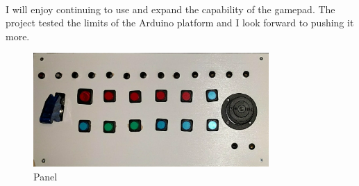 \documentclass[12pt,a4paper]{article}
\begin{document}
\paragraph{}
I will enjoy continuing to use and expand the capability of the gamepad. The project tested the limits of the Arduino platform and I look forward to pushing it more.

\begin{figure}[!h]
	\centering
	\includegraphics[width=0.8\textwidth]{panel}
	\caption{Panel}
	\label{fig:panel}
\end{figure}
\end{document}
